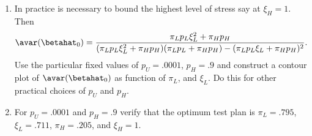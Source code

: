 \begin{exercise1}
\begin{enumerate}
of $\avar(\betahat_{0})$ as function of $\xi_{H}$.
Observe that the large-sample approximate variance is a decreasing
function of $\xi_{H}$.
\item
In practice is necessary to bound the
highest level of stress say 
at $\xi_{H}=1$. Then 
\begin{displaymath}
\avar(\betahat_{0})=
\frac{
\pi_{L} p_{L} \xi_{L}^{2} + \pi_{H} p_{H}
     }
     {
(\pi_{L} p_{L} \xi_{L}^{2} + \pi_{H} p_{H} )
(\pi_{L} p_{L} + \pi_{H} p_{H} )
-(\pi_{L} p_{L} \xi_{L}+\pi_{H} p_{H} )^{2}
     }.
\end{displaymath}
Use the particular fixed values of $p_{U}=.0001$, $p_{H}=.9$
and construct a contour plot of $\avar(\betahat_{0})$
as function of $\pi_{L}$, and $\xi_{L}$.
Do this for other practical choices of $p_{U}$ and
$p_{H}$.
\item
For $p_{U}=.0001$ and $p_{H}=.9$ verify that the optimum test plan is
$\pi_{L}=.795$, $\xi_{L}=.711$, $\pi_{H}=.205$, and $\xi_{H}=1$.
\end{enumerate}
\end{exercise1}

